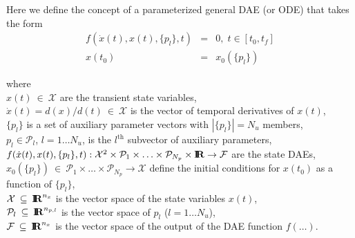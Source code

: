 \documentclass[pdf,ps2pdf,11pt]{SANDreport}
\begin{document}
Here we define the concept of a parameterized general DAE (or ODE) that takes
the form
%
\begin{eqnarray}
f\left( \dot{x}(t), x(t), \{p_l\}, t \right) & = & 0,
\; t \in \left[ t_0, t_f \right] \label{rythmos:eqn:gen:f} \\
x(t_0) & = & x_0(\{p_l\}) \label{rythmos:eqn:gen:f:ic}
\end{eqnarray}
\begin{tabbing}
\hspace{4ex}where\hspace{1ex}\= \\
\>	$x(t) \:\in\:\mathcal{X}$ are the transient state variables, \\
\>	$\dot{x}(t) = d(x)/d(t)\:\in\:\mathcal{X}$ is the vector of temporal derivatives of $x(t)$, \\
\>	$\{p_l\}$ is a set of auxiliary parameter vectors with $|\{p_l\}| = N_u$ members, \\
\>	$p_l\in\mathcal{P}_l$, $l=1 {}\ldots N_u$, is the $l^{\mbox{th}}$ subvector of auxiliary parameters, \\
\>	$f(\dot{x}(t), x(t), \{p_l\}, t) :
		\mathcal{X}^2 \times \mathcal{P}_1 \times \ldots \times \mathcal{P}_{N_p} \times \mbox{\textbf{I}}\hspace{-0.6ex}\mbox{\textbf{R}}
		\rightarrow \mathcal{F}$ are the state DAEs, \\
\>	$x_0(\{p_l\}) \:\in\:\mathcal{P}_1 \times \ldots \times \mathcal{P}_{N_p} \rightarrow \mathcal{X}$
		define the initial conditions for $x(t_0)$ as a function of $\{p_l\}$, \\
\>	$\mathcal{X} \:\subseteq\:\mbox{\textbf{I}}\hspace{-0.6ex}\mbox{\textbf{R}}^{n_x}$ is the vector space of the state variables $x(t)$, \\
\>	$\mathcal{P}_l \:\subseteq\:\mbox{\textbf{I}}\hspace{-0.6ex}\mbox{\textbf{R}}^{n_{p,l}}$ is the vector space of $p_l$ ($l = 1 {}\ldots N_u$), \\
\>	$\mathcal{F} \:\subseteq\:\mbox{\textbf{I}}\hspace{-0.6ex}\mbox{\textbf{R}}^{n_x}$ is the vector space of the output of the DAE function $f(\ldots)$.
\end{tabbing}
\end{document}
